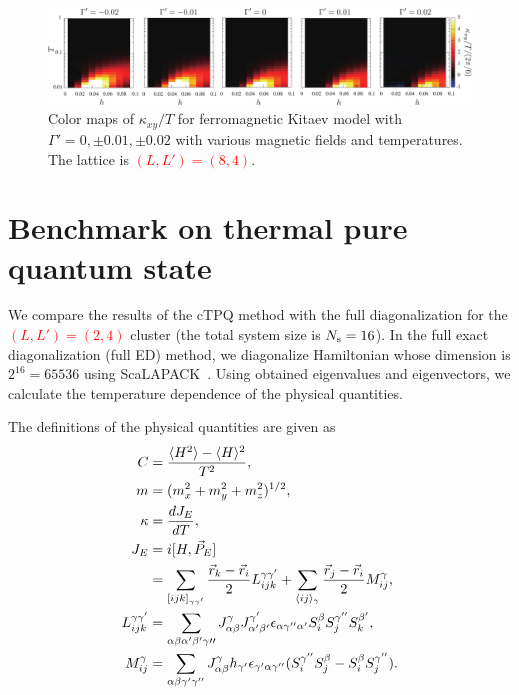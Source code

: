 \documentclass[reprint,amsmath,amssymb,aps,prx]{revtex4-2}
\newcommand{\red}[1]{\textcolor{red}{#1}}
\begin{document}
\begin{figure}
  \begin{center}
    \includegraphics[width=\linewidth]{Figs/color_map_Gp_XC4.pdf}
  \end{center}
  \caption{Color maps of $\kappa_{xy}/T$ for ferromagnetic Kitaev model with $\Gamma' = 0, \pm 0.01, \pm 0.02$ with various magnetic fields and temperatures. The lattice is \red{$(L, L') = (8, 4)$}.}
  \label{fig:color_map_Gp_XC4}
\end{figure}

\section{Benchmark on thermal pure quantum state}
We compare the results of the cTPQ method with
the full diagonalization for the \red{$(L, L') = (2, 4)$} cluster (the total system size is $N_{\rm s}=16$).
In the full exact diagonalization (full ED) method, we diagonalize Hamiltonian whose dimension is
$2^{16}=65536$ using ScaLAPACK~\cite{scalapack}. 
Using obtained eigenvalues and eigenvectors,
we calculate the temperature dependence of the physical quantities.

\if
The definitions of the physical quantities are given as
\begin{align}
C&= \frac{\langle H^2\rangle-\langle H\rangle^2}{T^2}, \\
m&= (m_{x}^2+m_{y}^2+m_z^2)^{1/2}, \\
\kappa&= \frac{d J_{E}}{dT}, \\
J_{E} &= i[H,\vec{P}_{E}] \\ \notag
&=\sum_{[ijk]_{\gamma\gamma^{\prime}}}
\frac{\vec{r}_k-\vec{r}_i}{2}L_{ijk}^{\gamma\gamma^{\prime}}+
\sum_{\langle ij\rangle_{\gamma}}
\frac{\vec{r}_j-\vec{r}_i}{2}M_{ij}^{\gamma}, \\
L_{ijk}^{\gamma\gamma^{\prime}}&=\sum_{\alpha\beta\alpha^{\prime}\beta^{\prime}\gamma{\prime\prime}}
J_{\alpha\beta}^{\gamma}
J_{\alpha^{\prime}\beta^{\prime}}^{\gamma^{\prime}}
\epsilon_{\alpha\gamma^{\prime\prime}\alpha^{\prime}}
S_{i}^{\beta}S_{j}^{\gamma^{\prime\prime}}S_{k}^{\beta^{\prime}}, \\
M_{ij}^{\gamma}&= \sum_{\alpha\beta\gamma^{\prime}\gamma^{\prime\prime}}
J_{\alpha\beta}^{\gamma}h_{\gamma^{\prime}}\epsilon_{\gamma^{\prime}\alpha\gamma^{\prime\prime}}
(S_{i}^{\gamma^{\prime\prime}}S_{j}^{\beta}-S_{i}^{\beta}S_{j}^{\gamma^{\prime\prime}}).
\end{align}
\fi
\end{document}
